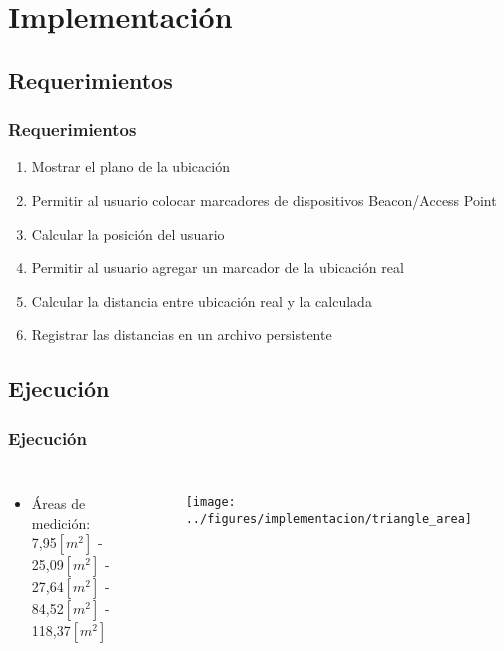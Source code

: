 \documentclass[mathserif]{beamer}
\begin{document}
\section{Implementación}

\subsection{Requerimientos}
\begin{frame}
\frametitle{Requerimientos}

\begin{enumerate}[1]
\pause
\item Mostrar el plano de la ubicación
\pause
\item Permitir al usuario colocar marcadores de dispositivos Beacon/Access Point
\pause
\item Calcular la posición del usuario
\pause
\item Permitir al usuario agregar un marcador de la ubicación real
\pause
\item Calcular la distancia entre ubicación real y la calculada
\pause
\item Registrar las distancias en un archivo persistente
\end{enumerate}


\end{frame}


\subsection{Ejecución}
\begin{frame}
\frametitle{Ejecución}

\begin{columns}


\begin{itemize}

\item Áreas de medición: \\7,95$[m^2]$ - 25,09$[m^2]$ - 27,64$[m^2]$ - 84,52$[m^2]$ - 118,37$[m^2]$

\end{itemize}



\begin{figure}
\texttt{[image: ../figures/implementacion/triangle\_area]}
\end{figure}

\end{columns}

\end{frame}
\end{document}
